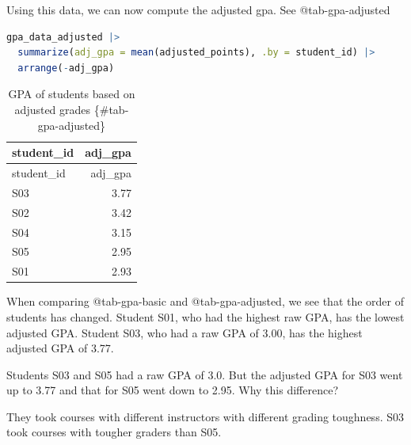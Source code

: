 \documentclass[
  12pt,
  letterpaper,
  DIV=11,
  numbers=noendperiod]{scrreprt}
\begin{document}
Using this data, we can now compute the adjusted gpa. See
@tab-gpa-adjusted

\begin{lstlisting}[language=R]
gpa_data_adjusted |> 
  summarize(adj_gpa = mean(adjusted_points), .by = student_id) |> 
  arrange(-adj_gpa)
\end{lstlisting}

\begin{longtable}[]{@{}lr@{}}
\caption{GPA of students based on adjusted grades
\{\#tab-gpa-adjusted\}}\tabularnewline
\toprule\noalign{}
student\_id & adj\_gpa \\
\midrule\noalign{}
\endfirsthead
\toprule\noalign{}
student\_id & adj\_gpa \\
\midrule\noalign{}
\endhead
\bottomrule\noalign{}
\endlastfoot
S03 & 3.77 \\
S02 & 3.42 \\
S04 & 3.15 \\
S05 & 2.95 \\
S01 & 2.93 \\
\end{longtable}

When comparing @tab-gpa-basic and @tab-gpa-adjusted, we see that the
order of students has changed. Student S01, who had the highest raw GPA,
has the lowest adjusted GPA. Student S03, who had a raw GPA of 3.00, has
the highest adjusted GPA of 3.77.

\begin{tcolorbox}[enhanced jigsaw, colback=white, leftrule=.75mm, toprule=.15mm, bottomtitle=1mm, breakable, coltitle=black, toptitle=1mm, title={Quick Check}, opacitybacktitle=0.6, colbacktitle=quarto-callout-note-color!10!white, arc=.35mm, left=2mm, colframe=quarto-callout-note-color-frame, titlerule=0mm, rightrule=.15mm, bottomrule=.15mm, opacityback=0]

Students S03 and S05 had a raw GPA of 3.0. But the adjusted GPA for S03
went up to 3.77 and that for S05 went down to 2.95. Why this difference?

\end{tcolorbox}

\begin{tcolorbox}[enhanced jigsaw, colback=white, leftrule=.75mm, toprule=.15mm, bottomtitle=1mm, breakable, coltitle=black, toptitle=1mm, title={Suggested answer}, opacitybacktitle=0.6, colbacktitle=quarto-callout-note-color!10!white, arc=.35mm, left=2mm, colframe=quarto-callout-note-color-frame, titlerule=0mm, rightrule=.15mm, bottomrule=.15mm, opacityback=0]

They took courses with different instructors with different grading
toughness. S03 took courses with tougher graders than S05.

\end{tcolorbox}
\end{document}
